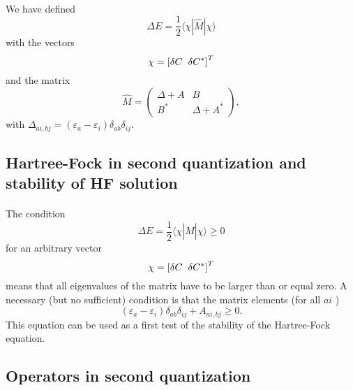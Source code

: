 \documentclass[%
twoside,                 %
final,                   %
10pt]{article}
\begin{document}
\paragraph{}
We have defined 
\[
\Delta E = \frac{1}{2} \langle \chi | \hat{M}| \chi \rangle
\]
with the vectors 
\[ 
\chi = \left[ \delta C\hspace{0.2cm} \delta C^*\right]^T
\]
and the matrix 
\[
\hat{M}=\left(\begin{array}{cc} \Delta + A & B \\ B^* & \Delta + A^*\end{array}\right),
\]
with $\Delta_{ai,bj} = (\varepsilon_a-\varepsilon_i)\delta_{ab}\delta_{ij}$.


\subsection*{Hartree-Fock in second quantization and stability of HF solution}

\paragraph{}
The condition
\[
\Delta E = \frac{1}{2} \langle \chi | \hat{M}| \chi \rangle \ge 0
\]
for an arbitrary  vector 
\[ 
\chi = \left[ \delta C\hspace{0.2cm} \delta C^*\right]^T
\]
means that all eigenvalues of the matrix have to be larger than or equal zero. 
A necessary (but no sufficient) condition is that the matrix elements (for all $ai$ )
\[
(\varepsilon_a-\varepsilon_i)\delta_{ab}\delta_{ij}+A_{ai,bj} \ge 0.
\]
This equation can be used as a first test of the stability of the Hartree-Fock equation.







\subsection*{Operators in second quantization}

\end{document}
